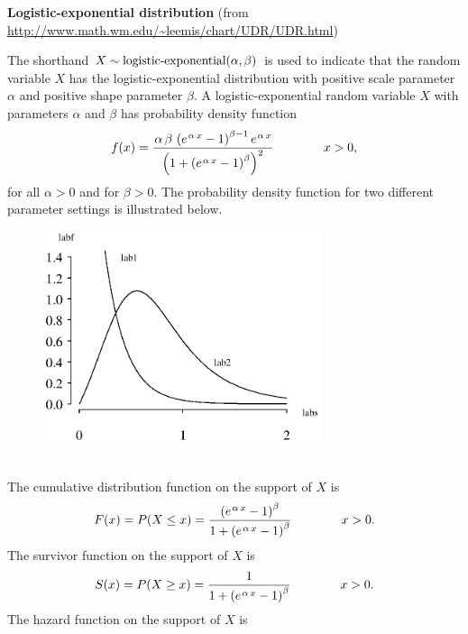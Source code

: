 \documentclass[12pt,fullpage]{article}
\begin{document}
\noindent
{\bf Logistic-exponential distribution} (from \color{blue}\url{http://www.math.wm.edu/~leemis/chart/UDR/UDR.html}\color{black})

\noindent
The shorthand $X \sim \hbox{logistic-exponential}(\alpha, \beta)$ is used to indicate that the
random variable $X$ has the logistic-exponential distribution with positive scale parameter $\alpha$ and
positive shape parameter $\beta$.
A logistic-exponential random variable $X$ with parameters $\alpha$ and $\beta$ has probability density function 
$$
f(x) = {\frac {{\it \kern 0.08 em \alpha}\,{\it \beta}\, \left( {e^{{\it \kern 0.08 em \alpha}\,x
}}-1 \right) ^{{\it \beta}-1}{e^{{\it \kern 0.08 em \alpha}\,x}}}{ \left( 1+ \left( {e
^{{\it \kern 0.08 em \alpha}\,x}}-1 \right) ^{{\it \beta}} \right) ^{2}}} \qquad \qquad x > 0,
$$
for all $\alpha > 0$ and for $\beta >0$. 
The probability density function for two different parameter settings is illustrated below.
{\begin{figure}[h!]
\begin{center}
\includegraphics[width=3.2in]{LogisticexponentialPlot.ps}
\end{center}
\end{figure}}\\
The cumulative distribution function on
the support of $X$ is
$$
F(x) = P(X \le x) = {\frac { \left( {e^{{\it \kern 0.08 em \alpha}\,x}}-1 \right) ^{{\it \beta}
}}{1+ \left( {e^{{\it \kern 0.08 em \alpha}\,x}}-1 \right) ^{{\it \beta}}}}  \qquad \qquad x > 0.
$$
The survivor function on the support of $X$ is
$$
S(x) = P(X \ge x) = \frac{1}{1+ \left( {e^{{\it \kern 0.08 em \alpha}\,x}}-1 \right) ^{{\it 
\beta}}}  \qquad \qquad x > 0.
$$
The hazard function on the support of $X$ is
\end{document}
